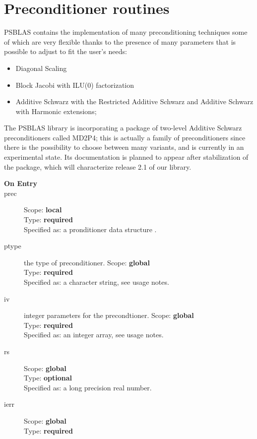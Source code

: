 \section{Preconditioner routines}
\label{sec:precs}

\label{sec:psprecs}
PSBLAS contains the implementation of many preconditioning
techniques some of which are very flexible thanks to the presence of
many parameters that is possible to adjust to fit the user's needs:
\begin{itemize}
\item Diagonal Scaling
\item Block Jacobi with ILU(0) factorization
\item Additive Schwarz with the Restricted Additive Schwarz and
  Additive Schwarz with Harmonic extensions;
\end{itemize}
The PSBLAS library is incorporating a package of two-level Additive
  Schwarz preconditioners called MD2P4; this is actually a family of 
  preconditioners since there is the possibility to choose between
  many variants, and is currently in an experimental state. Its
  documentation is planned to appear after stabilization of the
  package, which will characterize release  2.1 of our library.






\begin{description}
\item[\bf On Entry]
\item[prec] 
Scope: {\bf local} \\
Type: {\bf required}\\
Specified as: a pronditioner data structure \precdata.
\item[ptype] the type of preconditioner. 
Scope: {\bf global} \\
Type: {\bf required}\\
Specified as: a character string, see usage notes.
\item[iv] integer parameters for the precondtioner. 
Scope: {\bf global} \\
Type: {\bf required}\\
Specified as: an integer array, see usage notes. 
\item[rs] 
Scope: {\bf global} \\
Type: {\bf optional}\\
Specified as: a long precision real number.

\item[ierr] 
Scope: {\bf global} \\
Type: {\bf required}\\
\end{description}
